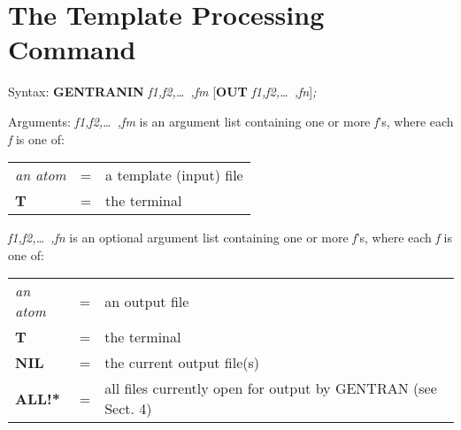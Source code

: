 \section{The Template Processing Command}
\label{templates}
\begin{describe}{Syntax:}
{\bf GENTRANIN} {\it f1,f2,\dots\ ,fm} [{\bf OUT} {\it f1,f2,\dots\ ,fn\/}]{\it ;}
\end{describe}
\begin{describe}{Arguments:}
{\it f1,f2,\dots\ ,fm\/} is an argument list containing one or more {\it f\/}'s,
where each {\it f\/} is one of:
\begin{center}
\begin{tabular}{lll}
{\it an atom}& = &a template (input) file\\
{\bf T}& = &the terminal\\
\end{tabular}
\end{center}
{\it f1,f2,\dots\ ,fn\/} is an optional argument list containing one or more
{\it f\/}'s, where each {\it f\/} is one of:
\begin{center}
\begin{tabular}{lll}
{\it an atom}& = &an output file\\
{\bf T}& = &the terminal\\
{\bf NIL}& = &the current output file(s)\\
{\bf ALL!*}& = &all files currently open for output by GENTRAN (see Sect. 4)\\
\end{tabular}
\end{center}
\end{describe}
